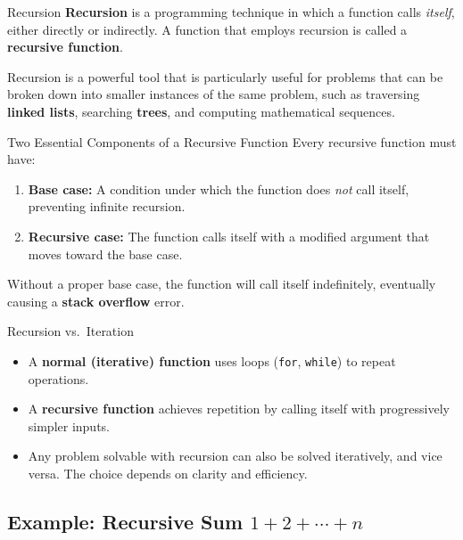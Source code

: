 \begin{definitionbox}{Recursion}
\textbf{Recursion} is a programming technique in which a function calls
\emph{itself}, either directly or indirectly. A function that employs
recursion is called a \textbf{recursive function}.
\end{definitionbox}

Recursion is a powerful tool that is particularly useful for problems that can
be broken down into smaller instances of the same problem, such as traversing
\textbf{linked lists}, searching \textbf{trees}, and computing mathematical
sequences.

\begin{importantbox}{Two Essential Components of a Recursive Function}
Every recursive function must have:
\begin{enumerate}
    \item \textbf{Base case:} A condition under which the function does
          \emph{not} call itself, preventing infinite recursion.
    \item \textbf{Recursive case:} The function calls itself with a modified
          argument that moves toward the base case.
\end{enumerate}
Without a proper base case, the function will call itself indefinitely,
eventually causing a \textbf{stack overflow} error.
\end{importantbox}

\begin{infobox}{Recursion vs.\ Iteration}
\begin{itemize}
    \item A \textbf{normal (iterative) function} uses loops
          (\texttt{for}, \texttt{while}) to repeat operations.
    \item A \textbf{recursive function} achieves repetition by calling itself
          with progressively simpler inputs.
    \item Any problem solvable with recursion can also be solved iteratively,
          and vice versa. The choice depends on clarity and efficiency.
\end{itemize}
\end{infobox}

\subsection{Example: Recursive Sum
    \texorpdfstring{$1 + 2 + \cdots + n$}{1+2+...+n}}
\label{subsec:recursive-sum}

